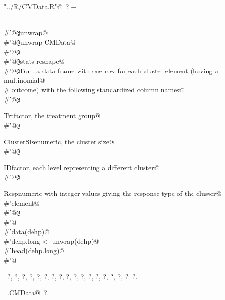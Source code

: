 \documentclass[reqno]{amsart}
\renewcommand{\NWtarget}[2]{\hypertarget{#1}{#2}}
\renewcommand{\NWlink}[2]{\hyperlink{#1}{#2}}
\begin{document}
\begin{flushleft} \small\label{scrap6}\raggedright\small
\NWtarget{nuweb?}{} \verb@"../R/CMData.R"@\nobreak\ {\footnotesize {?}}$\equiv$
\vspace{-1ex}
\begin{list}{}{} \item
\mbox{}\verb@@\\
\mbox{}\verb@#'@{\tt @}\verb@rdname unwrap@\\
\mbox{}\verb@#'@{\tt @}\verb@method unwrap CMData@\\
\mbox{}\verb@#'@{\tt @}\verb@export@\\
\mbox{}\verb@#'@{\tt @}\verb@importFrom stats reshape@\\
\mbox{}\verb@#'@{\tt @}\verb@return For : a data frame with one row for each cluster element (having a multinomial@\\
\mbox{}\verb@#'outcome) with the following standardized column names@\\
\mbox{}\verb@#'@{\tt @}\verb@return \item{Trt}{factor, the treatment group}@\\
\mbox{}\verb@#'@{\tt @}\verb@return \item{ClusterSize}{numeric, the cluster size}@\\
\mbox{}\verb@#'@{\tt @}\verb@return \item{ID}{factor, each level representing a different cluster}@\\
\mbox{}\verb@#'@{\tt @}\verb@return \item{Resp}{numeric with integer values giving the response type of the cluster@\\
\mbox{}\verb@#'element}@\\
\mbox{}\verb@#'@{\tt @}\verb@examples@\\
\mbox{}\verb@#'@\\
\mbox{}\verb@#'data(dehp)@\\
\mbox{}\verb@#'dehp.long <- unwrap(dehp)@\\
\mbox{}\verb@#'head(dehp.long)@\\
\mbox{}\verb@#'@\\
\mbox{}\verb@@{\NWsep}
\end{list}
\vspace{-1.5ex}
\footnotesize
\begin{list}{}{\setlength{\itemsep}{-\parsep}\setlength{\itemindent}{-\leftmargin}}
\item \NWtxtFileDefBy\ \NWlink{nuweb?}{?}\NWlink{nuweb?}{, ?}\NWlink{nuweb?}{, ?}\NWlink{nuweb?}{, ?}\NWlink{nuweb?}{, ?}\NWlink{nuweb?}{, ?}\NWlink{nuweb?}{, ?}\NWlink{nuweb?}{, ?}\NWlink{nuweb?}{, ?}\NWlink{nuweb?}{, ?}\NWlink{nuweb?}{, ?}\NWlink{nuweb?}{, ?}\NWlink{nuweb?}{, ?}\NWlink{nuweb?}{, ?}\NWlink{nuweb?}{, ?}\NWlink{nuweb?}{, ?}\NWlink{nuweb?}{, ?}\NWlink{nuweb?}{, ?}.
\item \NWtxtIdentsUsed\nobreak\  \verb@unwrap.CMData@\nobreak\ \NWlink{nuweb?}{?}.
\item{}
\end{list}
\vspace{4ex}
\end{flushleft}
\end{document}
